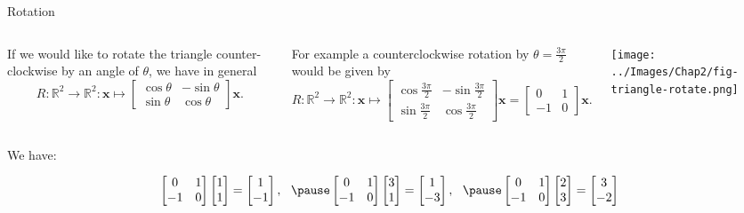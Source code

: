 \documentclass[xcoler=dvipsnames, aspectratio=169]{beamer}
\begin{document}
\begin{frame}{Rotation}
    \small

\begin{columns}[T]

\column{0.6\tw}

If we would like to rotate the triangle counter-clockwise by an angle of $\theta$, we have in general
\[ R: \mathbb{R}^2 \to \mathbb{R}^2: \mathbf{x} \mapsto \begin{bmatrix} \cos{\theta} & -\sin{\theta} \\ \sin{\theta} & \cos{\theta} \end{bmatrix} \mathbf{x} .\]
    \pause

For example a counterclockwise rotation by $\theta = \frac{3 \pi}{2}$ would be given by
\[ R: \mathbb{R}^2 \to \mathbb{R}^2: \mathbf{x} \mapsto \begin{bmatrix} \cos{\frac{3 \pi}{2}} & -\sin{\frac{3 \pi}{2}} \\ \sin{\frac{3 \pi}{2}} & \cos{\frac{3 \pi}{2}} \end{bmatrix} \mathbf{x} = \begin{bmatrix} 0 & 1 \\ -1 & 0 \end{bmatrix} \mathbf{x}.\]
    \pause

\column{0.4\tw}

\texttt{[image: ../Images/Chap2/fig-triangle-rotate.png]}

\end{columns}

    \pause
We have:

\[ \begin{bmatrix} 0 & 1 \\ -1 & 0 \end{bmatrix} \begin{bmatrix} 1 \\ 1 \end{bmatrix} = \begin{bmatrix} 1 \\ -1 \end{bmatrix} , \ \  \pause \begin{bmatrix} 0 & 1 \\ -1 & 0 \end{bmatrix} \begin{bmatrix} 3 \\ 1 \end{bmatrix} =  \begin{bmatrix} 1 \\ -3 \end{bmatrix} , \ \ \pause  \begin{bmatrix} 0 & 1 \\ -1 & 0 \end{bmatrix} \begin{bmatrix} 2 \\ 3 \end{bmatrix} =  \begin{bmatrix} 3 \\ -2 \end{bmatrix} \]


\end{frame}
\end{document}
